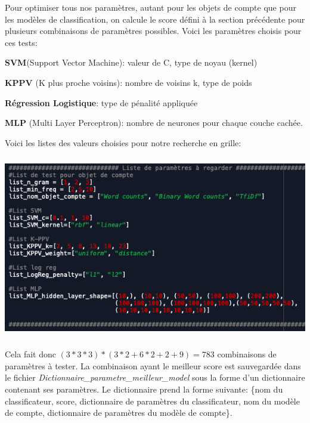 Pour optimiser tous nos paramètres, autant pour les objets de compte que pour les modèles de classification, on calcule le score défini à la section précédente pour plusieurs combinaisons de paramètres possibles. Voici les paramètres choisis pour ces tests:

\begin{description}
\item \textbf{SVM}(Support Vector Machine): valeur de C, type de noyau (kernel)
\item \textbf{KPPV} (K plus proche voisins): nombre de voisins k, type de poids
\item \textbf{Régression Logistique}: type de pénalité appliquée
\item \textbf{MLP} (Multi Layer Perceptron): nombre de neurones pour chaque couche cachée.
\end{description}
Voici les listes des valeurs choisies pour notre recherche en grille:

\includegraphics[width=\linewidth,height=8cm]{images/list_param}

Cela fait donc $(3*3*3) *(3*2 + 6*2 + 2 + 9)=783$ combinaisons de paramètres à tester. La combinaison ayant le meilleur score est sauvegardée dans le fichier \emph{Dictionnaire\_parametre\_meilleur\_model} sous la forme d'un dictionnaire contenant ses paramètres. 
Le dictionnaire prend la forme suivante: \{nom du classificateur, score, dictionnaire de paramètres du classificateur, nom du modèle de compte, dictionnaire de paramètres du modèle de compte\}.